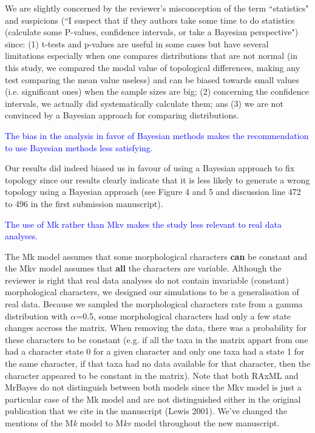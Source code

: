 \documentclass[11pt]{letter}
\begin{document}
\begin{letter}{}
We are slightly concerned by the reviewer's misconception of the term ``statistics" and suspicions (``I suspect that if they authors take some time to do statistics (calculate some P-values, confidence intervals, or take a Bayesian perspective") since: (1) t-tests and p-values are useful in some cases but have several limitations especially when one compares distributions that are not normal (in this study, we compared the modal value of topological differences, making any test comparing the mean value useless) and can be biased towards small values (i.e. significant ones) when the sample sizes are big; (2) concerning the confidence intervals, we actually did systematically calculate them; ans (3) we are not convinced by a Bayesian approach for comparing distributions.


\textcolor{blue}{The bias in the analysis in favor of Bayesian methods makes the recommendation to use Bayesian methods less satisfying.}

Our results did indeed biased us in favour of using a Bayesian approach to fix topology since our results clearly indicate that it is less likely to generate a wrong topology using a Bayesian approach (see Figure 4 and 5 and discussion line 472 to 496 in the first submission manuscript).

\textcolor{blue}{The use of Mk rather than Mkv makes the study less relevant to real data analyses.}

The Mk model assumes that some morphological characters \textbf{can} be constant and the Mkv model assumes that \textbf{all} the characters are variable. Although the reviewer is right that real data analyses do not contain invariable (constant) morphological characters, we designed our simulations to be a generalisation of real data. Because we sampled the morphological characters rate from a gamma distribution with $\alpha$=0.5, some morphological characters had only a few state changes accross the matrix. When removing the data, there was a probability for these characters to be constant (e.g. if all the taxa in the matrix appart from one had a character state 0 for a given character and only one taxa had a state 1 for the same character, if that taxa had no data available for that character, then the character appeared to be constant in the matrix). Note that both RAxML and MrBayes do not distinguish between both models since the Mkv model is just a particular case of the Mk model and are not distinguished either in the original publication that we cite in the manuscript (Lewis 2001). We've changed the mentions of the M\textit{k} model to M\textit{kv} model throughout the new manuscript.


\end{letter}
\end{document}
